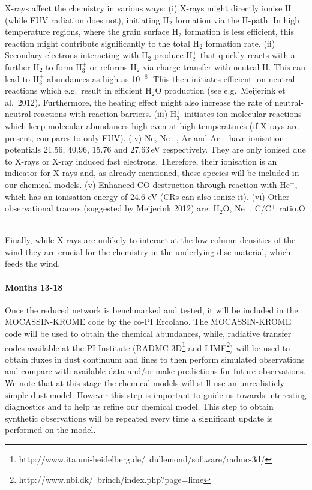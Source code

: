 \documentclass[10pt,fleqn,twoside]{article}
\begin{document}
X-rays affect the chemistry in various ways: (i) X-rays might directly ionise H (while FUV radiation does not), initiating H$_2$ formation via the H-path. In high temperature regions, where the grain surface H$_2$ formation is less efficient, this reaction might contribute significantly to the total H$_2$ formation rate. (ii) Secondary electrons interacting with H$_2$ produce H$_2^+$ that quickly reacts with a further H$_2$ to form H$_3^+$ or reforms H$_2$ via charge transfer with neutral H. This can lead to H$_3^+$ abundances as high as 10$^{-8}$. This then initiates efficient ion-neutral reactions which e.g.\ result in efficient H$_2$O production (see e.g.\ Meijerink et al.\ 2012). Furthermore, the heating effect might also increase the rate of neutral-neutral reactions with reaction barriers. (iii) H$_3^+$ initiates ion-molecular reactions which keep molecular abundances high even at high temperatures (if X-rays are present, compares to only FUV). (iv)
Ne, Ne+, Ar and Ar+ have ionisation potentials 21.56, 40.96, 15.76 and 27.63\,eV respectively. They are only ionised due to X-rays or X-ray induced fast electrons. Therefore, their ionisation is an indicator for X-rays and, as already mentioned, these species will be included in our chemical models. (v) Enhanced CO destruction through reaction with He$^+$, which has an ionisation energy of 24.6 eV (CRs can also ionize it). (vi) Other observational tracers (suggested by Meijerink 2012) are: H$_2$O, Ne$^+$, C/C$^+$ ratio,O$^+$.

Finally, while X-rays are unlikely to interact at the low column densities of the wind they are crucial for the chemistry in the underlying disc material, which feeds the wind. 

\paragraph{ Months 13-18}

 Once the reduced network is benchmarked and tested, it will be included in the MOCASSIN-KROME code by the co-PI Ercolano. The MOCASSIN-KROME code will be used to obtain the chemical abundances, while, radiative transfer codes available at the PI Institute (RADMC-3D\footnote{http://www.ita.uni-heidelberg.de/~dullemond/software/radmc-3d/} and LIME\footnote{http://www.nbi.dk/~brinch/index.php?page=lime}) will be used to obtain fluxes in dust continuum and lines to then perform simulated observations and compare with available data and/or make predictions for future observations. We note that at this stage the chemical models will still use an unrealisticly simple dust model. However this step is important to guide us towards interesting diagnostics and to help us refine our chemical model. This step to obtain synthetic observations will be repeated every time a significant update is performed on the model. 
\end{document}
